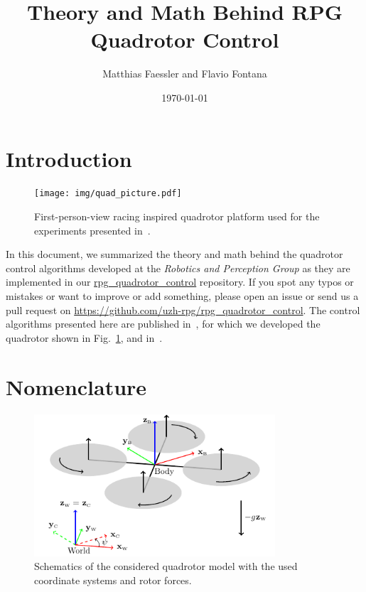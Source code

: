 \documentclass[10pt,a4paper,fleqn]{article}
\title{Theory and Math Behind RPG Quadrotor Control}
\author{
  Matthias Faessler and Flavio Fontana
}
\date{\today}
\begin{document}
\pagestyle{fancy}             %

\maketitle
\tableofcontents
\newpage


\section{Introduction}

\begin{figure}[t]
   \centering
   \texttt{[image: img/quad\_picture.pdf]}
   \caption{First-person-view racing inspired quadrotor platform used for the experiments presented in~\cite{Faessler18ral}.}
   \label{fig:quad_picture}
\end{figure}

In this document, we summarized the theory and math behind the quadrotor control algorithms developed at the \emph{Robotics and Perception Group} as they are implemented in our \href{https://github.com/uzh-rpg/rpg_quadrotor_control}{rpg\_quadrotor\_control} repository.
If you spot any typos or mistakes or want to improve or add something, please open an issue or send us a pull request on \url{https://github.com/uzh-rpg/rpg_quadrotor_control}.
The control algorithms presented here are published in~\cite{Faessler18ral}, for which we developed the quadrotor shown in Fig.~\ref{fig:quad_picture}, and in~\cite{Faessler17ral}.

\section{Nomenclature} \label{sec:nomenclature}

\begin{figure}[h]
   \centering
   \includegraphics[width=0.8\textwidth]{img/quadrotor.pdf}
   \caption{Schematics of the considered quadrotor model with the used coordinate systems and rotor forces.}
   \label{fig:quad}
\end{figure}
\end{document}
